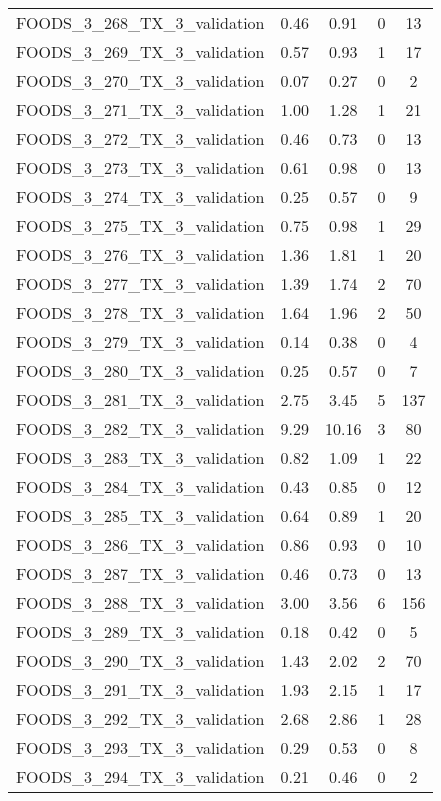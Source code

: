 \begin{table}
\begin{tabular}{|l|c|c|c|c|}
FOODS\_3\_268\_TX\_3\_validation & 0.46 & 0.91 & 0 & 13 \\
FOODS\_3\_269\_TX\_3\_validation & 0.57 & 0.93 & 1 & 17 \\
FOODS\_3\_270\_TX\_3\_validation & 0.07 & 0.27 & 0 & 2 \\
FOODS\_3\_271\_TX\_3\_validation & 1.00 & 1.28 & 1 & 21 \\
FOODS\_3\_272\_TX\_3\_validation & 0.46 & 0.73 & 0 & 13 \\
FOODS\_3\_273\_TX\_3\_validation & 0.61 & 0.98 & 0 & 13 \\
FOODS\_3\_274\_TX\_3\_validation & 0.25 & 0.57 & 0 & 9 \\
FOODS\_3\_275\_TX\_3\_validation & 0.75 & 0.98 & 1 & 29 \\
FOODS\_3\_276\_TX\_3\_validation & 1.36 & 1.81 & 1 & 20 \\
FOODS\_3\_277\_TX\_3\_validation & 1.39 & 1.74 & 2 & 70 \\
FOODS\_3\_278\_TX\_3\_validation & 1.64 & 1.96 & 2 & 50 \\
FOODS\_3\_279\_TX\_3\_validation & 0.14 & 0.38 & 0 & 4 \\
FOODS\_3\_280\_TX\_3\_validation & 0.25 & 0.57 & 0 & 7 \\
FOODS\_3\_281\_TX\_3\_validation & 2.75 & 3.45 & 5 & 137 \\
FOODS\_3\_282\_TX\_3\_validation & 9.29 & 10.16 & 3 & 80 \\
FOODS\_3\_283\_TX\_3\_validation & 0.82 & 1.09 & 1 & 22 \\
FOODS\_3\_284\_TX\_3\_validation & 0.43 & 0.85 & 0 & 12 \\
FOODS\_3\_285\_TX\_3\_validation & 0.64 & 0.89 & 1 & 20 \\
FOODS\_3\_286\_TX\_3\_validation & 0.86 & 0.93 & 0 & 10 \\
FOODS\_3\_287\_TX\_3\_validation & 0.46 & 0.73 & 0 & 13 \\
FOODS\_3\_288\_TX\_3\_validation & 3.00 & 3.56 & 6 & 156 \\
FOODS\_3\_289\_TX\_3\_validation & 0.18 & 0.42 & 0 & 5 \\
FOODS\_3\_290\_TX\_3\_validation & 1.43 & 2.02 & 2 & 70 \\
FOODS\_3\_291\_TX\_3\_validation & 1.93 & 2.15 & 1 & 17 \\
FOODS\_3\_292\_TX\_3\_validation & 2.68 & 2.86 & 1 & 28 \\
FOODS\_3\_293\_TX\_3\_validation & 0.29 & 0.53 & 0 & 8 \\
FOODS\_3\_294\_TX\_3\_validation & 0.21 & 0.46 & 0 & 2 \\

\end{tabular}
\end{table}
